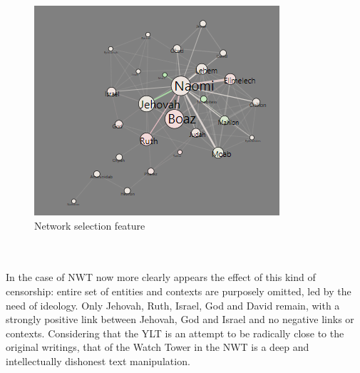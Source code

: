 \documentclass[sigchi]{article}
\begin{document}
\begin{figure}[!htpb]
    \centering
    \includegraphics[scale=0.5]{template-komputasi-latex/YLT plots/network selection YLT.png}
    \caption{Network selection feature}
    \label{fig:network_selection}
\end{figure} \\ \\

In the case of NWT now more clearly appears the effect of this kind of censorship: entire set of entities and contexts are purposely omitted, led by the need of ideology.
Only Jehovah, Ruth, Israel, God and David remain, with a strongly positive link between Jehovah, God and Israel and no negative links or contexts. Considering that the YLT is an attempt to be radically close to the original writings, that of the Watch Tower in the NWT is a deep and intellectually dishonest text manipulation.
\end{document}
